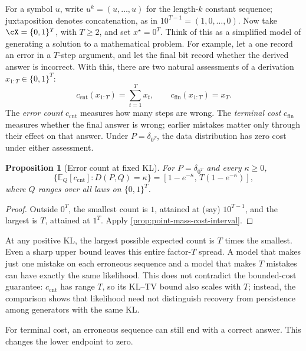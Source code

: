 \documentclass[11pt,twoside]{article}
\newcommand{\E}{\mathbb E}
\newcommand{\KL}{D}
\newtheorem{proposition}[theorem]{Proposition}
\theoremstyle{definition}
\theoremstyle{remark}
\begin{document}
For a symbol \(u\), write \(u^k=(u,\ldots,u)\) for the length-\(k\)
constant sequence; juxtaposition denotes concatenation, as in
\(10^{T-1}=(1,0,\ldots,0)\).
Now take \(\cX=\{0,1\}^T\), with \(T\ge2\), and set
\(x^\star=0^T\).
Think of this as a simplified model of generating a solution to a
mathematical problem.
For example, let a one record an error in a $T$-step argument, and let
the final bit record whether the derived answer is incorrect.
With this, there are two natural assessments of a derivation $x_{1:T}\in \{0,1\}^T$:
\begin{equation}
 c_{\mathrm{cnt}}(x_{1:T})=\sum_{t=1}^T x_t,\qquad
 c_{\mathrm{fin}}(x_{1:T})=x_T.
 \label{eq:binary-cost}
\end{equation}
The \emph{error count} \(c_{\mathrm{cnt}}\) measures how many steps are wrong. The
\emph{terminal cost} \(c_{\mathrm{fin}}\) measures whether the final
answer is wrong; earlier mistakes matter only through their effect
on that answer.
Under $P=\delta_{0^T}$, the data distribution has zero cost under
either assessment.

\begin{proposition}[Error count at fixed KL]
\label{prop:binary-moduli}
For \(P=\delta_{0^T}\) and every \(\kappa\ge0\),
\begin{equation}
 \{\E_Q[c_{\mathrm{cnt}}]:\KL(P, Q)=\kappa\}
 =[1-e^{-\kappa},\,T(1-e^{-\kappa})],
 \label{eq:binary-kl-level}
\end{equation}
where \(Q\) ranges over all laws on \(\{0,1\}^T\).
\end{proposition}

\begin{proof}
Outside \(0^T\), the smallest count is \(1\), attained at (say)
\(10^{T-1}\), and the largest is \(T\), attained at \(1^T\).
Apply \cref{prop:point-mass-cost-interval}.
\end{proof}

At any positive KL, the largest possible expected count is \(T\)
times the smallest. Even a sharp upper bound leaves this entire
factor-\(T\) spread. A model that makes just one mistake on each
erroneous sequence and a model that makes \(T\) mistakes can have
exactly the same likelihood.
This does not contradict the bounded-cost guarantee:
\(c_{\mathrm{cnt}}\) has range \(T\), so its KL--TV bound also scales
with \(T\); instead, the comparison shows that likelihood need not
distinguish recovery from persistence among generators with the same KL.

For terminal cost, an erroneous sequence can still end with a correct
answer. This changes the lower endpoint to zero.
\end{document}
